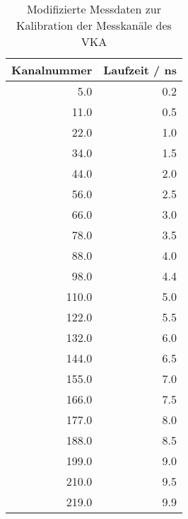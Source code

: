 \begin{table}[h!]
\centering
\begin{tabular}{rr}
\toprule
 Kanalnummer &  Laufzeit / ns \\
\midrule
         5.0 &            0.2 \\
        11.0 &            0.5 \\
        22.0 &            1.0 \\
        34.0 &            1.5 \\
        44.0 &            2.0 \\
        56.0 &            2.5 \\
        66.0 &            3.0 \\
        78.0 &            3.5 \\
        88.0 &            4.0 \\
        98.0 &            4.4 \\
       110.0 &            5.0 \\
       122.0 &            5.5 \\
       132.0 &            6.0 \\
       144.0 &            6.5 \\
       155.0 &            7.0 \\
       166.0 &            7.5 \\
       177.0 &            8.0 \\
       188.0 &            8.5 \\
       199.0 &            9.0 \\
       210.0 &            9.5 \\
       219.0 &            9.9 \\
\bottomrule
\end{tabular}
\caption{Modifizierte Messdaten zur Kalibration der Messkanäle des VKA}
\label{tab:calib}
\end{table}